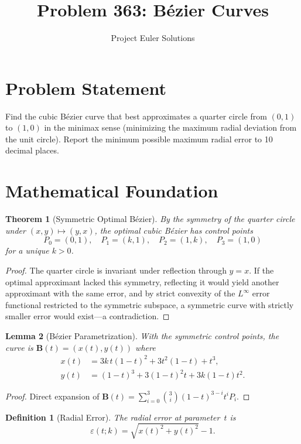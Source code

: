 \documentclass[11pt]{article}
\title{Problem 363: B\'ezier Curves}
\author{Project Euler Solutions}
\date{}
\newtheorem{theorem}{Theorem}
\newtheorem{lemma}[theorem]{Lemma}
\newtheorem{definition}{Definition}
\begin{document}
\maketitle

\section{Problem Statement}

Find the cubic B\'ezier curve that best approximates a quarter circle from $(0,1)$ to $(1,0)$ in the minimax sense (minimizing the maximum radial deviation from the unit circle). Report the minimum possible maximum radial error to 10 decimal places.

\section{Mathematical Foundation}

\begin{theorem}[Symmetric Optimal B\'ezier]
By the symmetry of the quarter circle under $(x,y) \mapsto (y,x)$, the optimal cubic B\'ezier has control points
\[
P_0 = (0,1),\quad P_1 = (k,1),\quad P_2 = (1,k),\quad P_3 = (1,0)
\]
for a unique $k > 0$.
\end{theorem}

\begin{proof}
The quarter circle is invariant under reflection through $y = x$. If the optimal approximant lacked this symmetry, reflecting it would yield another approximant with the same error, and by strict convexity of the $L^\infty$ error functional restricted to the symmetric subspace, a symmetric curve with strictly smaller error would exist---a contradiction.
\end{proof}

\begin{lemma}[B\'ezier Parametrization]
With the symmetric control points, the curve is $\mathbf{B}(t) = (x(t), y(t))$ where
\begin{align*}
x(t) &= 3k\,t(1-t)^2 + 3t^2(1-t) + t^3,\\
y(t) &= (1-t)^3 + 3(1-t)^2 t + 3k(1-t)t^2.
\end{align*}
\end{lemma}

\begin{proof}
Direct expansion of $\mathbf{B}(t) = \sum_{i=0}^{3}\binom{3}{i}(1-t)^{3-i}t^i P_i$.
\end{proof}

\begin{definition}[Radial Error]
The radial error at parameter~$t$ is
\[
\varepsilon(t; k) = \sqrt{x(t)^2 + y(t)^2} - 1.
\]
\end{definition}
\end{document}
